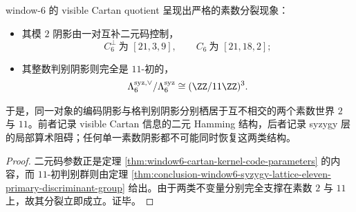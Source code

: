 \begin{corollary}\label{cor:conclusion-window6-code-discriminant-prime-splitting}
window-\(6\) 的 visible Cartan quotient 呈现出严格的素数分裂现象：
\begin{itemize}
  \item 其模 \(2\) 阴影由一对互补二元码控制，
  \[
  C_6^\perp\ \text{为 }[21,3,9],
  \qquad
  C_6\ \text{为 }[21,18,2];
  \]
  \item 其整数判别阴影则完全是 \(11\)-初的，
  \[
  \Lambda_6^{\mathrm{syz},\vee}/\Lambda_6^{\mathrm{syz}}
  \cong
  (\ZZ/11\ZZ)^3.
  \]
\end{itemize}
于是，同一对象的编码阴影与格判别阴影分别栖居于互不相交的两个素数世界 \(2\) 与 \(11\)。前者记录 visible Cartan 信息的二元 Hamming 结构，后者记录 syzygy 层的局部算术阻碍；任何单一素数阴影都不可能同时恢复这两类结构。
\end{corollary}
\begin{proof}
二元码参数正是定理 \ref{thm:window6-cartan-kernel-code-parameters} 的内容，而 \(11\)-初判别群则由定理 \ref{thm:conclusion-window6-syzygy-lattice-eleven-primary-discriminant-group} 给出。由于两类不变量分别完全支撑在素数 \(2\) 与 \(11\) 上，故其分裂立即成立。证毕。
\end{proof}

